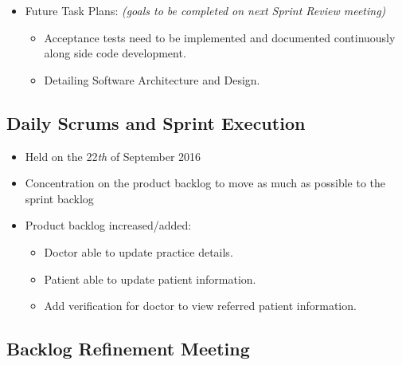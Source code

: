 \documentclass[a4paper]{article}
\begin{document}
\begin{itemize}
\begin{itemize}
\end{itemize}

\item Future Task Plans: \emph{(goals to be completed on next Sprint Review meeting)}

\begin{itemize}

\item Acceptance tests need to be implemented and documented continuously along side code development.

\item Detailing Software Architecture and Design.

\end{itemize}

\end{itemize}

\subsection{Daily Scrums and Sprint Execution}

\begin{itemize}
\item Held on the 22\textit{th} of September 2016
\item Concentration on the product backlog to move as much as possible to the sprint backlog
\item Product backlog increased/added:

\begin{itemize}
\item Doctor able to update practice details.
\item Patient able to update patient information.
\item Add verification for doctor to view referred patient information.
\end{itemize}

\end{itemize}

\subsection{Backlog Refinement Meeting}
\end{document}
